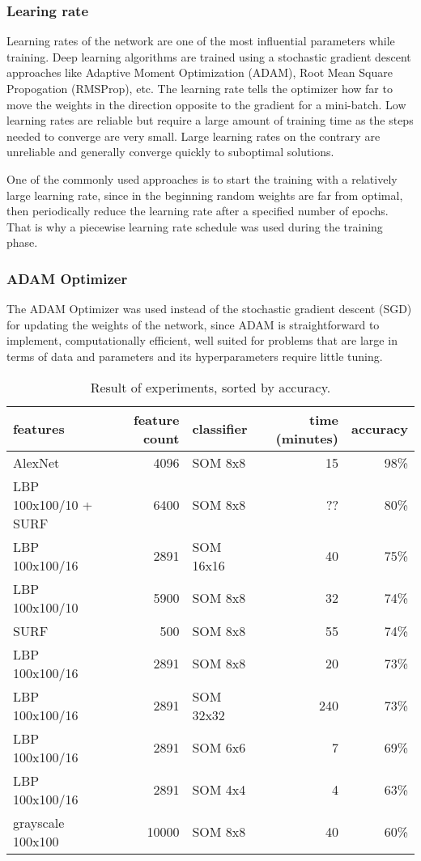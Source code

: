 \documentclass[doc/report.tex]{subfiles}
\begin{document}
\subsubsection{Learing rate}
Learning rates of the network are one of the most influential parameters while training. Deep learning algorithms are trained using a stochastic gradient descent approaches like Adaptive Moment Optimization (ADAM), Root Mean Square Propogation (RMSProp), etc. The learning rate tells the optimizer how far to move the weights in the direction opposite to the gradient for a mini-batch. Low learning rates are reliable but require a large amount of training time as the steps needed to converge are very small. Large learning rates on the contrary are unreliable and generally converge quickly to suboptimal solutions.

One of the commonly used approaches is to start the training with a relatively large learning rate, since in the beginning random weights are far from optimal, then periodically reduce the learning rate after a specified number of epochs. That is why a piecewise learning rate schedule was used during the training phase.

\subsubsection{ADAM Optimizer}
The ADAM Optimizer was used instead of the stochastic gradient descent (SGD) for updating the weights of the network, since ADAM is straightforward to implement, computationally efficient, well suited for problems that are large in terms of data and parameters and its hyperparameters require little tuning.
    
\begin{table}[h]
\centering
\caption{Result of experiments, sorted by accuracy.}
\label{tbl:feature}
\begin{tabular}{lrlrr}
    features & feature count & classifier & time (minutes) & accuracy \\\hline
    AlexNet & 4096 & SOM 8x8 & 15 & 98\% \\
    LBP 100x100/10 + SURF & 6400 & SOM 8x8 & ?? & 80\% \\
    LBP 100x100/16 & 2891 & SOM 16x16 & 40 & 75\% \\
    LBP 100x100/10 & 5900 & SOM 8x8 & 32 & 74\% \\
    SURF & 500 & SOM 8x8 & 55 & 74\% \\
    LBP 100x100/16 & 2891 & SOM 8x8 & 20 & 73\% \\
    LBP 100x100/16 & 2891 & SOM 32x32 & 240 & 73\% \\
    LBP 100x100/16 & 2891 & SOM 6x6 & 7 & 69\% \\
    LBP 100x100/16 & 2891 & SOM 4x4 & 4 & 63\% \\
    grayscale 100x100 & 10000 & SOM 8x8 & 40 & 60\% \\
\end{tabular}%
\end{table}
\end{document}
